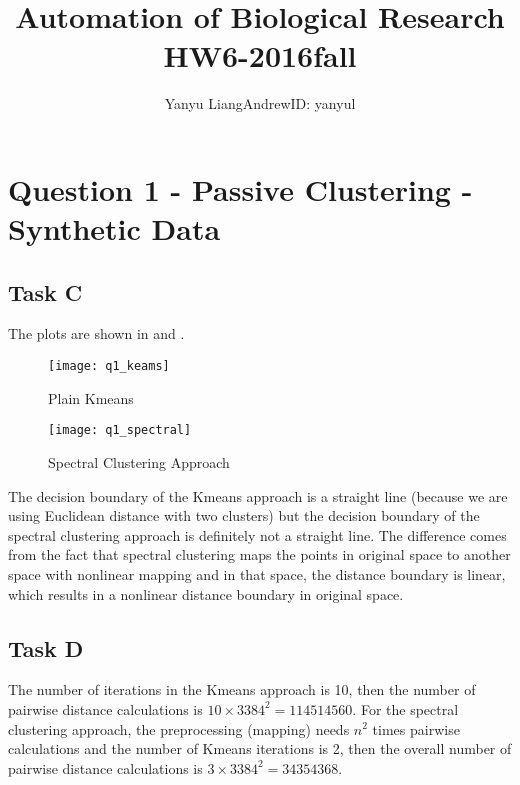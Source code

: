 \documentclass{article}
\begin{document}
\title{Automation of Biological Research HW6-2016fall}
\author{Yanyu Liang\quad AndrewID: yanyul}
\maketitle


\section*{Question 1 - Passive Clustering - Synthetic Data}

\subsection*{Task C}

  The plots are shown in  and .

  \begin{figure}[!ht]
    \begin{minipage}{.45\textwidth}
      \centering
      \texttt{[image: q1\_keams]}
      \caption{Plain Kmeans}
      \label{fig:q1a}
    \end{minipage}
    \hfill
    \begin{minipage}{.45\textwidth}
      \centering
      \texttt{[image: q1\_spectral]}
      \caption{Spectral Clustering Approach}
      \label{fig:q1b}
    \end{minipage}
  \end{figure}

  The decision boundary of the Kmeans approach is a straight line (because we are using Euclidean distance with two clusters) but the decision boundary of the spectral clustering approach is definitely not a straight line. The difference comes from the fact that spectral clustering maps the points in original space to another space with nonlinear mapping and in that space, the distance boundary is linear, which results in a nonlinear distance boundary in original space.

\subsection*{Task D}

  The number of iterations in the Kmeans approach is 10, then the number of pairwise distance calculations is $10 \times 3384^2 = 114514560$. For the spectral clustering approach, the preprocessing (mapping) needs $n^2$ times pairwise calculations and the number of Kmeans iterations is 2, then the overall number of pairwise distance calculations is $3 \times 3384^2 = 34354368$.
\end{document}

